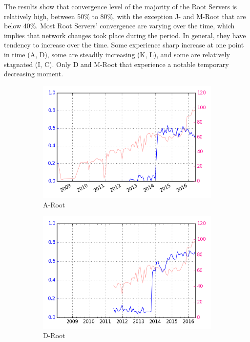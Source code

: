 The results show that convergence level of the majority of the Root Servers is relatively high, between 50\% to 80\%, with the exception J- and M-Root that are below 40\%. Most Root Servers’ convergence are varying over the time, which implies that network changes took place during the period. In general, they have tendency to increase over the time. Some experience sharp increase at one point in time (A, D), some are steadily increasing (K, L), and some are relatively stagnated (I, C). Only D and M-Root that experience a notable temporary decreasing moment.

\begin{figure}[h]
	\begin{subfigure}{.5\textwidth}
		\centering
		\includegraphics[width=.8\linewidth]{img/convergence_over_time_a}
		\caption{A-Root}
		\label{fig:ch04:convergence_a}
	\end{subfigure}
	\begin{subfigure}{.5\textwidth}
		\centering
		\includegraphics[width=.8\linewidth]{img/convergence_over_time_d}
		\caption{D-Root}
		\label{fig:ch04:convergence_d}
	\end{subfigure}
	\begin{subfigure}{.5\textwidth}

\end{subfigure}
\end{figure}

